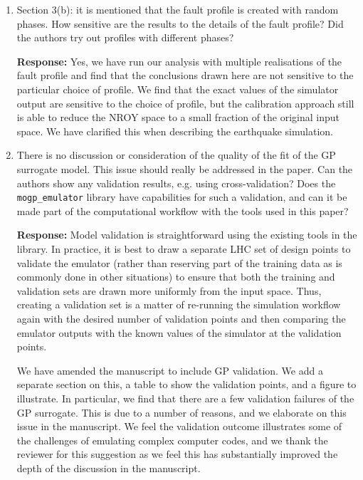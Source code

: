 \documentclass{article}
\begin{document}
\begin{enumerate}
\item Section 3(b): it is mentioned that the fault profile is created with random phases. How sensitive are the results to the details of the fault profile? Did the authors try out profiles with different phases?

  \textbf{Response:} Yes, we have run our analysis with multiple realisations
  of the fault profile and find that the conclusions drawn here are not
  sensitive to the particular choice of profile. We find that the exact
  values of the simulator output are sensitive to the choice of profile,
  but the calibration approach still is able to reduce the NROY space to
  a small fraction of the original input space. We have clarified this
  when describing the earthquake simulation.

\item There is no discussion or consideration of the quality of the fit of the GP surrogate model. This issue should really be addressed in the paper. Can the authors show any validation results, e.g. using cross-validation? Does the \texttt{mogp\_emulator} library have capabilities for such a validation, and can it be made part of the computational workflow with the tools used in this paper?

  \textbf{Response:} Model validation is straightforward using the existing
  tools in the library. In practice, it is best to draw a separate LHC set
  of design points to validate the emulator (rather than reserving part
  of the training data as is commonly done in other situations) to ensure
  that both the training and validation sets are drawn more uniformly from
  the input space. Thus, creating a validation set is a matter of re-running
  the simulation workflow again with the desired number of validation points
  and then comparing the emulator outputs with the known values of the
  simulator at the validation points.

  We have amended the manuscript to include GP validation. We add a separate
  section on this, a table to show the validation points, and a figure to
  illustrate. In particular,
  we find that there are a few validation failures of the GP surrogate.
  This is due to a number of reasons, and we elaborate on this issue
  in the manuscript.
  We feel the validation outcome illustrates some of the challenges of
  emulating complex computer codes, and we thank the reviewer for this
  suggestion as we feel this has substantially improved the depth of
  the discussion in the manuscript.


\end{enumerate}
\end{document}
